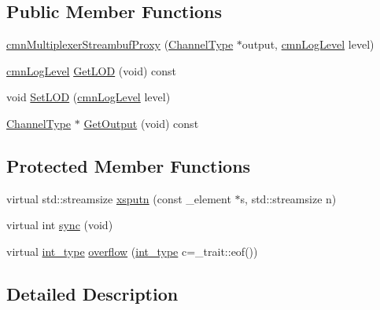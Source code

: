 \subsection*{Public Member Functions}
\begin{DoxyCompactItemize}
\item 
\hyperlink{classcmn_multiplexer_streambuf_proxy_a19cff8cb9fe6ab6410c1beeae2a13b59}{cmn\+Multiplexer\+Streambuf\+Proxy} (\hyperlink{classcmn_multiplexer_streambuf_proxy_aad26781c796870ad583a690f1d4132bb}{Channel\+Type} $\ast$output, \hyperlink{cmn_log_lo_d_8h_a70c67165c37a0971e0dd1a85d4edaaae}{cmn\+Log\+Level} level)
\item 
\hyperlink{cmn_log_lo_d_8h_a70c67165c37a0971e0dd1a85d4edaaae}{cmn\+Log\+Level} \hyperlink{classcmn_multiplexer_streambuf_proxy_a50f130ccf182f35f00d59f5b91890801}{Get\+L\+O\+D} (void) const 
\item 
void \hyperlink{classcmn_multiplexer_streambuf_proxy_ac89fbe628f8c171f1f8871b1641045e3}{Set\+L\+O\+D} (\hyperlink{cmn_log_lo_d_8h_a70c67165c37a0971e0dd1a85d4edaaae}{cmn\+Log\+Level} level)
\item 
\hyperlink{classcmn_multiplexer_streambuf_proxy_aad26781c796870ad583a690f1d4132bb}{Channel\+Type} $\ast$ \hyperlink{classcmn_multiplexer_streambuf_proxy_ae7ac63ce755124ec9943925052848cd9}{Get\+Output} (void) const 
\end{DoxyCompactItemize}
\subsection*{Protected Member Functions}
\begin{DoxyCompactItemize}
\item 
virtual std\+::streamsize \hyperlink{classcmn_multiplexer_streambuf_proxy_a43ad7db2163d7cc48b55be06686d285a}{xsputn} (const \+\_\+element $\ast$s, std\+::streamsize n)
\item 
virtual int \hyperlink{classcmn_multiplexer_streambuf_proxy_a7e7755a46401f3d10e6c1f2100af0a4d}{sync} (void)
\item 
virtual \hyperlink{classcmn_multiplexer_streambuf_proxy_ac600a28e3e3c860fc54ca7e7931bc6df}{int\+\_\+type} \hyperlink{classcmn_multiplexer_streambuf_proxy_a10a4e0b433962e191fcbff9b8238ed99}{overflow} (\hyperlink{classcmn_multiplexer_streambuf_proxy_ac600a28e3e3c860fc54ca7e7931bc6df}{int\+\_\+type} c=\+\_\+trait\+::eof())
\end{DoxyCompactItemize}


\subsection{Detailed Description}
